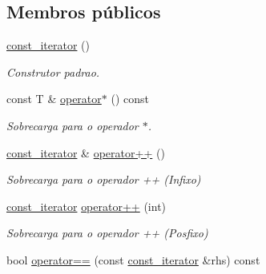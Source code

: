 \subsection*{Membros públicos}
\begin{DoxyCompactItemize}
\item 
\hyperlink{class_forward__list_1_1const__iterator_a93186c9aaa00f55fd1a83e81b177d328}{const\+\_\+iterator} ()\hypertarget{class_forward__list_1_1const__iterator_a93186c9aaa00f55fd1a83e81b177d328}{}\label{class_forward__list_1_1const__iterator_a93186c9aaa00f55fd1a83e81b177d328}

\begin{DoxyCompactList}\small\item\em Construtor padrao. \end{DoxyCompactList}\item 
const T \& \hyperlink{class_forward__list_1_1const__iterator_a06cc80474e018e57db44c6e71785d282}{operator$\ast$} () const \hypertarget{class_forward__list_1_1const__iterator_a06cc80474e018e57db44c6e71785d282}{}\label{class_forward__list_1_1const__iterator_a06cc80474e018e57db44c6e71785d282}

\begin{DoxyCompactList}\small\item\em Sobrecarga para o operador $\ast$. \end{DoxyCompactList}\item 
\hyperlink{class_forward__list_1_1const__iterator}{const\+\_\+iterator} \& \hyperlink{class_forward__list_1_1const__iterator_a5ad8f003577bf29f9405592c3ca23b4c}{operator++} ()\hypertarget{class_forward__list_1_1const__iterator_a5ad8f003577bf29f9405592c3ca23b4c}{}\label{class_forward__list_1_1const__iterator_a5ad8f003577bf29f9405592c3ca23b4c}

\begin{DoxyCompactList}\small\item\em Sobrecarga para o operador ++ (Infixo) \end{DoxyCompactList}\item 
\hyperlink{class_forward__list_1_1const__iterator}{const\+\_\+iterator} \hyperlink{class_forward__list_1_1const__iterator_ab86aea1ef2a39e5b015168a3fda9d6b3}{operator++} (int)\hypertarget{class_forward__list_1_1const__iterator_ab86aea1ef2a39e5b015168a3fda9d6b3}{}\label{class_forward__list_1_1const__iterator_ab86aea1ef2a39e5b015168a3fda9d6b3}

\begin{DoxyCompactList}\small\item\em Sobrecarga para o operador ++ (Posfixo) \end{DoxyCompactList}\item 
bool \hyperlink{class_forward__list_1_1const__iterator_aeeea7a0b0827d1771d91d477d6cdbbe1}{operator==} (const \hyperlink{class_forward__list_1_1const__iterator}{const\+\_\+iterator} \&rhs) const \hypertarget{class_forward__list_1_1const__iterator_aeeea7a0b0827d1771d91d477d6cdbbe1}{}\label{class_forward__list_1_1const__iterator_aeeea7a0b0827d1771d91d477d6cdbbe1}


\end{DoxyCompactItemize}

